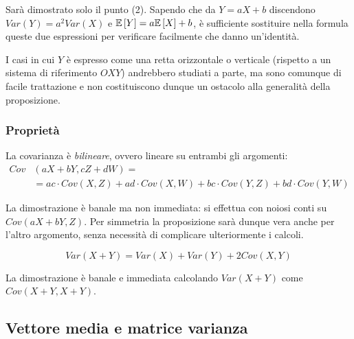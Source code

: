 \smallskip
\begin{dimo}
  Sarà dimostrato solo il punto (2). Sapendo che da $Y = aX + b$ discendono $Var(Y) = a^2 Var(X)$ e $\mathbb E \left[ Y \right] = a \mathbb E \left[ X \right] + b$, è sufficiente sostituire nella formula queste due espressioni per verificare facilmente che danno un'identità.
\end{dimo}
\begin{nb}
  I casi in cui $Y$ è espresso come una retta orizzontale o verticale (rispetto a un sistema di riferimento $OXY$) andrebbero studiati a parte, ma sono comunque di facile trattazione e non costituiscono dunque un ostacolo alla generalità della proposizione.
\end{nb}
\subsubsection{Proprietà}

\begin{prop}
  La covarianza è \textit{bilineare}, ovvero lineare su entrambi gli argomenti:
  \begin{align*}
    Cov&(aX+bY,cZ+dW) = \\
    &= ac \cdot Cov(X,Z) + ad \cdot Cov(X,W) + bc \cdot Cov(Y,Z) + bd \cdot Cov(Y,W)
  \end{align*}
\end{prop}
La dimostrazione è banale ma non immediata: si effettua con noiosi conti su $Cov(aX+bY, Z)$. Per simmetria la proposizione sarà dunque vera anche per l'altro argomento, senza necessità di complicare ulteriormente i calcoli.

\begin{coro}
  $$Var(X+Y) = Var(X) + Var(Y) + 2 Cov(X,Y)$$
\end{coro}
La dimostrazione è banale e immediata calcolando $Var(X+Y)$ come $Cov(X+Y,X+Y)$.

\subsection{Vettore media e matrice varianza}

